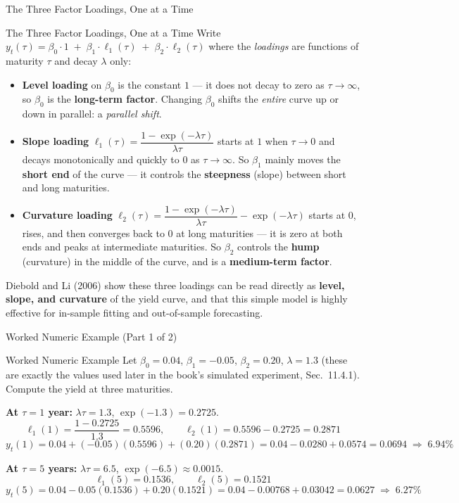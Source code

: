 \documentclass[aspectratio=169,10pt]{beamer}
\begin{document}
\begin{frame}{The Three Factor Loadings, One at a Time}

\begin{block}{The Three Factor Loadings, One at a Time}
  Write $y_t(\tau) = \beta_0 \cdot 1 \;+\; \beta_1 \cdot \ell_1(\tau) \;+\; \beta_2 \cdot \ell_2(\tau)$
  where the \emph{loadings} are functions of maturity $\tau$ and decay $\lambda$ only:
  \begin{itemize}
    \item \textbf{Level loading} on $\beta_0$ is the constant $1$ --- it does
      not decay to zero as $\tau \to \infty$, so $\beta_0$ is the
      \textbf{long-term factor}. Changing $\beta_0$ shifts the \emph{entire}
      curve up or down in parallel: a \emph{parallel shift}.
    \item \textbf{Slope loading} $\ell_1(\tau) = \dfrac{1-\exp(-\lambda\tau)}{\lambda\tau}$
      starts at $1$ when $\tau \to 0$ and decays monotonically and quickly
      to $0$ as $\tau \to \infty$. So $\beta_1$ mainly moves the
      \textbf{short end} of the curve --- it controls the \textbf{steepness}
      (slope) between short and long maturities.
    \item \textbf{Curvature loading} $\ell_2(\tau) = \dfrac{1-\exp(-\lambda\tau)}{\lambda\tau} - \exp(-\lambda\tau)$
      starts at $0$, rises, and then converges back to $0$ at long
      maturities --- it is zero at both ends and peaks at intermediate
      maturities. So $\beta_2$ controls the \textbf{hump} (curvature) in the
      middle of the curve, and is a \textbf{medium-term factor}.
  \end{itemize}
  Diebold and Li (2006) show these three loadings can be read directly as
  \textbf{level, slope, and curvature} of the yield curve, and that this
  simple model is highly effective for in-sample fitting and out-of-sample
  forecasting.
\end{block}

\end{frame}

\begin{frame}{Worked Numeric Example (Part 1 of 2)}

\begin{exampleblock}{Worked Numeric Example}
  Let $\beta_0 = 0.04$, $\beta_1 = -0.05$, $\beta_2 = 0.20$, $\lambda = 1.3$
  (these are exactly the values used later in the book's simulated
  experiment, Sec.\ 11.4.1). Compute the yield at three maturities.

  \textbf{At $\tau = 1$ year:} $\lambda\tau = 1.3$, $\exp(-1.3) = 0.2725$.
  \[
    \ell_1(1) = \frac{1-0.2725}{1.3} = 0.5596, \qquad
    \ell_2(1) = 0.5596 - 0.2725 = 0.2871
  \]
  \[
    y_t(1) = 0.04 + (-0.05)(0.5596) + (0.20)(0.2871) = 0.04 - 0.0280 + 0.0574 = 0.0694 \;\Rightarrow\; 6.94\%
  \]

  \textbf{At $\tau = 5$ years:} $\lambda\tau = 6.5$, $\exp(-6.5) \approx 0.0015$.
  \[
    \ell_1(5) = 0.1536, \qquad \ell_2(5) = 0.1521
  \]
  \[
    y_t(5) = 0.04 - 0.05(0.1536) + 0.20(0.1521) = 0.04 - 0.00768 + 0.03042 = 0.0627 \;\Rightarrow\; 6.27\%
  \]
\end{exampleblock}

\end{frame}
\end{document}
